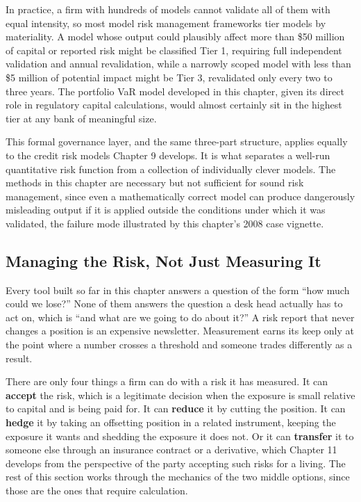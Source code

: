 \documentclass[../ai_in_finance]{subfiles}
\begin{document}
In practice, a firm with hundreds of models cannot validate all of them with equal intensity, so most model risk management frameworks tier models by materiality. A model whose output could plausibly affect more than \$50 million of capital or reported risk might be classified Tier 1, requiring full independent validation and annual revalidation, while a narrowly scoped model with less than \$5 million of potential impact might be Tier 3, revalidated only every two to three years. The portfolio VaR model developed in this chapter, given its direct role in regulatory capital calculations, would almost certainly sit in the highest tier at any bank of meaningful size.

This formal governance layer, and the same three-part structure, applies equally to the credit risk models Chapter 9 develops. It is what separates a well-run quantitative risk function from a collection of individually clever models. The methods in this chapter are necessary but not sufficient for sound risk management, since even a mathematically correct model can produce dangerously misleading output if it is applied outside the conditions under which it was validated, the failure mode illustrated by this chapter's 2008 case vignette.

\subsection{Managing the Risk, Not Just Measuring It}
\label{sec:managing-risk}

Every tool built so far in this chapter answers a question of the form ``how much could we lose?'' None of them answers the question a desk head actually has to act on, which is ``and what are we going to do about it?'' A risk report that never changes a position is an expensive newsletter. Measurement earns its keep only at the point where a number crosses a threshold and someone trades differently as a result.

There are only four things a firm can do with a risk it has measured. It can \textbf{accept} the risk, which is a legitimate decision when the exposure is small relative to capital and is being paid for. It can \textbf{reduce} it by cutting the position. It can \textbf{hedge} it by taking an offsetting position in a related instrument, keeping the exposure it wants and shedding the exposure it does not. Or it can \textbf{transfer} it to someone else through an insurance contract or a derivative, which Chapter 11 develops from the perspective of the party accepting such risks for a living. The rest of this section works through the mechanics of the two middle options, since those are the ones that require calculation.
\end{document}
